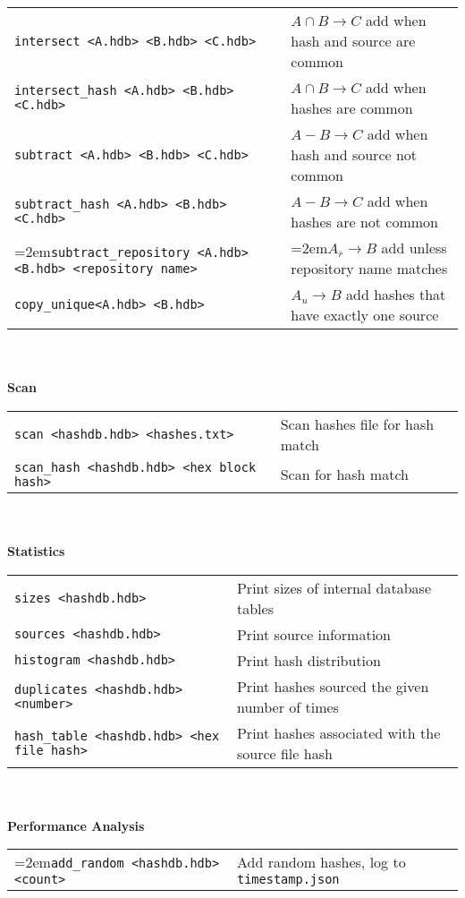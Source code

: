 \begin{footnotesize}
\begin{tabular}{p{3.6 in} p{3.0 in}}
\texttt{intersect <A.hdb> <B.hdb> <C.hdb>} & $A \cap B \rightarrow C$ add when hash and source are common\\
\texttt{intersect\_hash <A.hdb> <B.hdb> <C.hdb>} & $A \cap B \rightarrow C$ add when hashes are common\\
\texttt{subtract <A.hdb> <B.hdb> <C.hdb>} & $A - B \rightarrow C$ add when hash and source not common\\
\texttt{subtract\_hash <A.hdb> <B.hdb> <C.hdb>} & $A - B \rightarrow C$ add when hashes are not common\\
\hangindent=2em\texttt{subtract\_repository <A.hdb> <B.hdb> <repository name>} & \hangindent=2em$A_{\overline{r}} \rightarrow B$ add unless repository name matches\\
\texttt{copy\_unique<A.hdb> <B.hdb>} & $A_u \rightarrow B$ add hashes that have exactly one source\\
\end{tabular}
\\
\\
\textbf{Scan} \\
\begin{tabular}{p{3.6 in} p{3.0 in}}
\texttt{scan <hashdb.hdb> <hashes.txt>} & Scan hashes file for hash match \\
\texttt{scan\_hash <hashdb.hdb> <hex block hash>} & Scan for hash match \\
\end{tabular}
\\
\\
\textbf{Statistics}\\
\begin{tabular}{p{3.6 in} p{3.0 in}}
\texttt{sizes <hashdb.hdb>} & Print sizes of internal database tables \\
\texttt{sources <hashdb.hdb>} & Print source information \\
\texttt{histogram <hashdb.hdb>} & Print hash distribution \\
\texttt{duplicates <hashdb.hdb> <number>} & Print hashes sourced the given number of times \\
\texttt{hash\_table <hashdb.hdb> <hex file hash>} & Print hashes associated with the source file hash\\
\end{tabular}
\\
\\
\textbf{Performance Analysis}\\
\begin{tabular}{p{3.6 in} p{4 in}}
\hangindent=2em\texttt{add\_random <hashdb.hdb> <count>} & Add random hashes, log to \texttt{timestamp.json}\\

\end{tabular}
\end{footnotesize}
